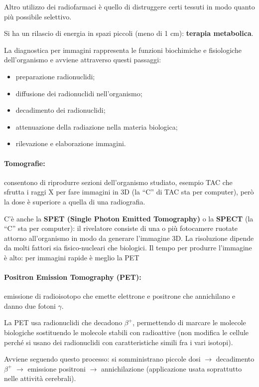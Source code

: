 \documentclass[a4paper,11pt,twoside,openany]{book}
\theoremstyle{definition}
\theoremstyle{plain}
\theoremstyle{plain}
\theoremstyle{definition}
\begin{document}
Altro utilizzo dei radiofarmaci è quello di distruggere certi tessuti in modo quanto più possibile selettivo.

Si ha un rilascio di energia in spazi piccoli (meno di 1 cm): \textbf{terapia metabolica}.

La diagnostica per immagini rappresenta le funzioni biochimiche e fisiologiche dell'organismo e avviene attraverso questi passaggi:
\begin{itemize}
\item preparazione radionuclidi;
\item diffusione dei radionuclidi nell'organismo;
\item decadimento dei radionuclidi;
\item attenuazione della radiazione nella materia biologica;
\item rilevazione e elaborazione immagini.
\end{itemize}

\paragraph{Tomografie:} consentono di riprodurre sezioni dell'organismo studiato, esempio TAC che sfrutta i raggi X per fare immagini in 3D (la ``C'' di TAC sta per computer), però la dose è superiore a quella di una radiografia.

C'è anche la \textbf{SPET (Single Photon Emitted Tomography)} o la \textbf{SPECT} (la ``C'' sta per computer): il rivelatore consiste di una o più fotocamere ruotate attorno all'organismo in modo da generare l'immagine 3D. La risoluzione dipende da molti fattori sia fisico-nucleari che biologici. Il tempo per produrre l'immagine è alto: per immagini rapide è meglio la PET

\paragraph{Positron Emission Tomography (PET):} emissione di radioisotopo che emette elettrone e positrone che annichilano e danno due fotoni $\gamma$.

La PET usa radionuclidi che decadono $\beta^+$, permettendo di marcare le molecole biologiche sostituendo le molecole stabili con radioattive (non modifica le cellule perché si usano dei radionuclidi con caratteristiche simili fra i vari isotopi).

Avviene seguendo questo processo: si somministrano piccole dosi $\longrightarrow$ decadimento $\beta^+$ $\longrightarrow$ emissione positroni $\longrightarrow$ annichilazione (applicazione usata soprattutto nelle attività cerebrali).
\end{document}
